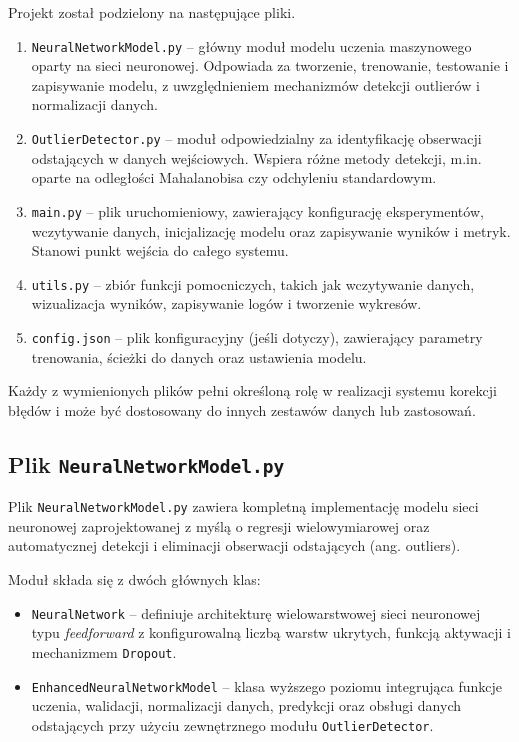 \documentclass{classrep}
\begin{document}
\pagebreak
Projekt został podzielony na następujące pliki.

\begin{enumerate}
	\item \texttt{NeuralNetworkModel.py} – główny moduł modelu uczenia maszynowego oparty na sieci neuronowej. Odpowiada za tworzenie, trenowanie, testowanie i zapisywanie modelu, z uwzględnieniem mechanizmów detekcji outlierów i normalizacji danych.

	\item \texttt{OutlierDetector.py} – moduł odpowiedzialny za identyfikację obserwacji odstających w danych wejściowych. Wspiera różne metody detekcji, m.in. oparte na odległości Mahalanobisa czy odchyleniu standardowym.

	\item \texttt{main.py} – plik uruchomieniowy, zawierający konfigurację eksperymentów, wczytywanie danych, inicjalizację modelu oraz zapisywanie wyników i metryk. Stanowi punkt wejścia do całego systemu.

	\item \texttt{utils.py} – zbiór funkcji pomocniczych, takich jak wczytywanie danych, wizualizacja wyników, zapisywanie logów i tworzenie wykresów.

	\item \texttt{config.json} – plik konfiguracyjny (jeśli dotyczy), zawierający parametry trenowania, ścieżki do danych oraz ustawienia modelu.
\end{enumerate}

Każdy z wymienionych plików pełni określoną rolę w realizacji systemu korekcji błędów i może być dostosowany do innych zestawów danych lub zastosowań.
\subsection{Plik \texttt{NeuralNetworkModel.py}}

Plik \texttt{NeuralNetworkModel.py} zawiera kompletną implementację modelu sieci neuronowej zaprojektowanej z myślą o regresji wielowymiarowej oraz automatycznej detekcji i eliminacji obserwacji odstających (ang. outliers).

Moduł składa się z dwóch głównych klas:
\begin{itemize}
	\item \texttt{NeuralNetwork} – definiuje architekturę wielowarstwowej sieci neuronowej typu \textit{feedforward} z konfigurowalną liczbą warstw ukrytych, funkcją aktywacji i mechanizmem \texttt{Dropout}.
	\item \texttt{EnhancedNeuralNetworkModel} – klasa wyższego poziomu integrująca funkcje uczenia, walidacji, normalizacji danych, predykcji oraz obsługi danych odstających przy użyciu zewnętrznego modułu \texttt{OutlierDetector}.
\end{itemize}
\end{document}
